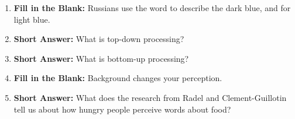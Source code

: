 \begin{enumerate}[label=\textbf{Q2.9.\arabic*}]
      \item \textbf{Fill in the Blank:} Russians use the word \underline{\hspace{3cm}} to describe the dark blue, and \underline{\hspace{3cm}} for light blue. \\
      

      \item \textbf{Short Answer:} What is top-down processing? \\

      \item \textbf{Short Answer:} What is bottom-up processing? \\

      \item \textbf{Fill in the Blank:} Background changes your \underline{\hspace{3cm}} perception.

      \item \textbf{Short Answer:} What does the research from Radel and Clement-Guillotin tell us about how hungry people perceive words about food? \\

\end{enumerate}